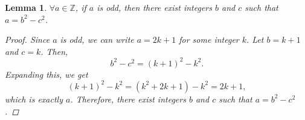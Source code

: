 \documentclass[]{article}
\newtheorem{lemmax}{Lemma}[section]
\begin{document}
\begin{lemmax}
$\forall a \in \mathbb{Z}$, if $a$ is odd, then there exist integers $b$ and $c$ such that $a = b^2 - c^2$.
\begin{proof}
Since $a$ is odd, we can write $a = 2k + 1$ for some integer $k$. Let $b = k + 1$ and $c = k$. Then,
\[
b^2 - c^2 = (k + 1)^2 - k^2.
\]
Expanding this, we get
\[
(k + 1)^2 - k^2 = (k^2 + 2k + 1) - k^2 = 2k + 1,
\]
which is exactly $a$. Therefore, there exist integers $b$ and $c$ such that $a = b^2 - c^2$.
\end{proof}
\end{lemmax}
\end{document}
